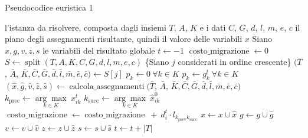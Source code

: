 \begin{algorithm}
    \caption{Pseudocodice euristica 1}
    \label{alg:euristica-semplificazione-modello}
    \begin{algorithmic}[1]
        \Require l'istanza da risolvere, composta dagli insiemi $T$, $A$, $K$ e i dati $C$, $G$, $d$, $l$, $m$, $e$, $c$
        \Ensure il piano degli assegnamenti risultante, quindi il valore delle variabili $x$
        \State Siano $x, g, v, z, s$ le variabili del risultato globale
        \State $t \gets -1$
        \State $\operatorname{costo\_migrazione} \gets 0$
        \State $S \gets \operatorname{split}(T, A, K, C, G, d, l, m, e, c)$
            \State \{Siano $j$ considerati in ordine crescente\}
            \State $(\bar{T}$, $\bar{A}$, $\bar{K}, \bar{C}, \bar{G}, \bar{d}, \bar{l}, \bar{m}, \bar{e}, \bar{c}) \gets S[j]$
                \State $p_k \gets 0 ~ \forall k \in K$
            \Else
                \State $p_k \gets g^t_k ~ \forall k \in K$
            \EndIf
            \State $(\hat{x}, \hat{g}, \hat{v}, \hat{z}, \hat{s}) \gets \operatorname{calcola\_assegnamenti}(\bar{T}$, $\bar{A}$, $\bar{K}, \bar{C}, \bar{G}, \bar{d}, \bar{l}, \bar{m}, \bar{e}, \bar{c})$
                \State $k_{\operatorname{prec}} \gets \underset{k \in K}{\arg\max} ~ x^t_{ik}$
                \State $k_{\operatorname{succ}} \gets \underset{k \in K}{\arg\max} ~ \hat{x}^0_{ik}$
                        \State $\operatorname{costo\_migrazione} \gets \operatorname{costo\_migrazione} ~ + ~ d^t_i \cdot l_{k_{\operatorname{prev}} k_{\operatorname{succ}}}$
                    \EndIf
                \EndFor
            \EndIf
            \State $x \gets x \cup \hat{x}$
            \State $g \gets g \cup \hat{g}$
            \State $v \gets v \cup \hat{v}$
            \State $z \gets z \cup \hat{z}$
            \State $s \gets s \cup \hat{s}$
            \State $t \gets t + |T|$
        \EndFor
    \end{algorithmic}
\end{algorithm}
